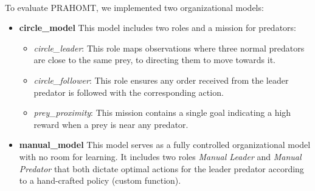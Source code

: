 \documentclass[runningheads]{llncs}
\theoremstyle{freethm}
\theoremstyle{proofoutline}
\begin{document}
\

\noindent To evaluate PRAHOMT, we implemented two organizational models:

\begin{itemize}
    \item \textbf{circle\_model} \quad This model includes two roles and a mission for predators:
          \begin{itemize}
              \item \textit{circle\_leader}: This role maps observations where three normal predators are close to the same prey, to directing them to move towards it.
              \item \textit{circle\_follower}: This role ensures any order received from the leader predator is followed with the corresponding action.
              \item \textit{prey\_proximity}: This mission contains a single goal indicating a high reward when a prey is near any predator.
          \end{itemize}

    \item \textbf{manual\_model} \quad This model serves as a fully controlled organizational model with no room for learning. It includes two roles \textit{Manual Leader} and \textit{Manual Predator} that both dictate optimal actions for the leader predator according to a hand-crafted policy (custom function).
\end{itemize}

\end{document}
